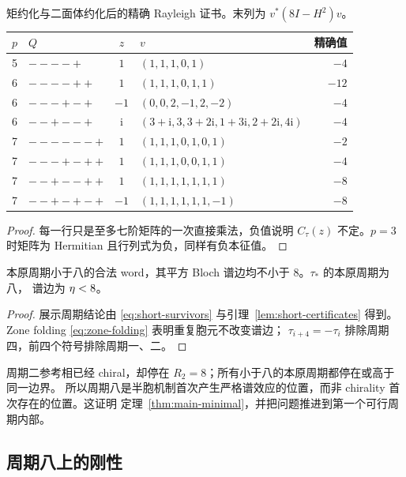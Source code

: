 \begin{table}[t]
\centering
\caption{矩约化与二面体约化后的精确 Rayleigh 证书。末列为 $v^*(8I-H^2)v$。}
\label{tab:certificates}
\scriptsize
\begin{tabularx}{\textwidth}{@{}c l c >{\raggedright\arraybackslash}X r@{}}
\toprule $p$&$Q$&$z$&$v$&精确值\\ \midrule
5&$----+$&$1$&$(1,1,1,0,1)$&$-4$\\
6&$----++$&$1$&$(1,1,1,0,1,1)$&$-12$\\
6&$---+-+$&$-1$&$(0,0,2,-1,2,-2)$&$-4$\\
6&$--+--+$&$\mathrm i$&$(3+\mathrm i,3,3+2\mathrm i,1+3\mathrm i,2+2\mathrm i,4\mathrm i)$&$-4$\\
7&$------+$&$1$&$(1,1,1,0,1,0,1)$&$-2$\\
7&$---+-++$&$1$&$(1,1,1,0,0,1,1)$&$-4$\\
7&$--+--++$&$1$&$(1,1,1,1,1,1,1)$&$-8$\\
7&$--+-+-+$&$-1$&$(1,1,1,1,1,1,-1)$&$-8$\\ \bottomrule
\end{tabularx}
\end{table}

\begin{proof}
每一行只是至多七阶矩阵的一次直接乘法，负值说明 $C_\tau(z)$ 不定。$p=3$ 时矩阵为
Hermitian 且行列式为负，同样有负本征值。
\end{proof}

\begin{theorem}
\label{thm:minimal-period}
本原周期小于八的合法 word，其平方 Bloch 谱边均不小于 $8$。$\tau_*$ 的本原周期为八，
谱边为 $\eta<8$。
\end{theorem}

\begin{proof}
展示周期结论由 \eqref{eq:short-survivors} 与引理~\ref{lem:short-certificates} 得到。
Zone folding \eqref{eq:zone-folding} 表明重复胞元不改变谱边；
$\tau_{i+4}=-\tau_i$ 排除周期四，前四个符号排除周期一、二。
\end{proof}

周期二参考相已经 chiral，却停在 $R_2=8$；所有小于八的本原周期都停在或高于同一边界。
所以周期八是半胞机制首次产生严格谱效应的位置，而非 chirality 首次存在的位置。这证明
定理~\ref{thm:main-minimal}，并把问题推进到第一个可行周期内部。

\FloatBarrier
\subsection{周期八上的刚性}


